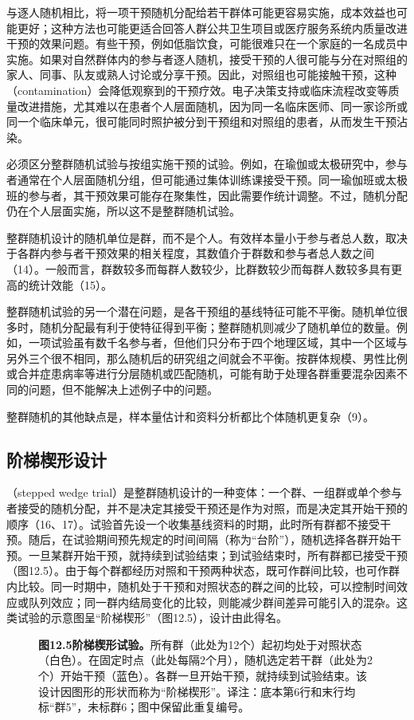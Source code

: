 与逐人随机相比，将一项干预随机分配给若干群体可能更容易实施，成本效益也可能更好；这种方法也可能更适合回答人群公共卫生项目或医疗服务系统内质量改进干预的效果问题。有些干预，例如低脂饮食，可能很难只在一个家庭的一名成员中实施。如果对自然群体内的参与者逐人随机，接受干预的人很可能与分在对照组的家人、同事、队友或熟人讨论或分享干预。因此，对照组也可能接触干预，这种（contamination）会降低观察到的干预疗效。电子决策支持或临床流程改变等质量改进措施，尤其难以在患者个人层面随机，因为同一名临床医师、同一家诊所或同一个临床单元，很可能同时照护被分到干预组和对照组的患者，从而发生干预沾染。

必须区分整群随机试验与按组实施干预的试验。例如，在瑜伽或太极研究中，参与者通常在个人层面随机分组，但可能通过集体训练课接受干预。同一瑜伽班或太极班的参与者，其干预效果可能存在聚集性，因此需要作统计调整。不过，随机分配仍在个人层面实施，所以这不是整群随机试验。

整群随机设计的随机单位是群，而不是个人。有效样本量小于参与者总人数，取决于各群内参与者干预效果的相关程度，其数值介于群数和参与者总人数之间（14）。一般而言，群数较多而每群人数较少，比群数较少而每群人数较多具有更高的统计效能（15）。

整群随机试验的另一个潜在问题，是各干预组的基线特征可能不平衡。随机单位很多时，随机分配最有利于使特征得到平衡；整群随机则减少了随机单位的数量。例如，一项试验虽有数千名参与者，但他们只分布于四个地理区域，其中一个区域与另外三个很不相同，那么随机后的研究组之间就会不平衡。按群体规模、男性比例或合并症患病率等进行分层随机或匹配随机，可能有助于处理各群重要混杂因素不同的问题，但不能解决上述例子中的问题。

整群随机的其他缺点是，样本量估计和资料分析都比个体随机更复杂（9）。

\subsection{阶梯楔形设计}
（stepped wedge trial）是整群随机设计的一种变体：一个群、一组群或单个参与者接受的随机分配，并不是决定其接受干预还是作为对照，而是决定其开始干预的顺序（16、17）。试验首先设一个收集基线资料的时期，此时所有群都不接受干预。随后，在试验期间预先规定的时间间隔（称为“台阶”），随机选择各群开始干预。一旦某群开始干预，就持续到试验结束；到试验结束时，所有群都已接受干预（图12.5）。由于每个群都经历对照和干预两种状态，既可作群间比较，也可作群内比较。同一时期中，随机处于干预和对照状态的群之间的比较，可以控制时间效应或队列效应；同一群内结局变化的比较，则能减少群间差异可能引入的混杂。这类试验的示意图呈“阶梯楔形”（图12.5），设计由此得名。
\begin{figure}[htbp]\centering\chTwelveStepped
\caption*{\textbf{图12.5\quad 阶梯楔形试验。}所有群（此处为12个）起初均处于对照状态（白色）。在固定时点（此处每隔2个月），随机选定若干群（此处为2个）开始干预（蓝色）。各群一旦开始干预，就持续到试验结束。该设计因图形的形状而称为“阶梯楔形”。译注：底本第6行和末行均标“群5”，未标群6；图中保留此重复编号。}
\end{figure}

